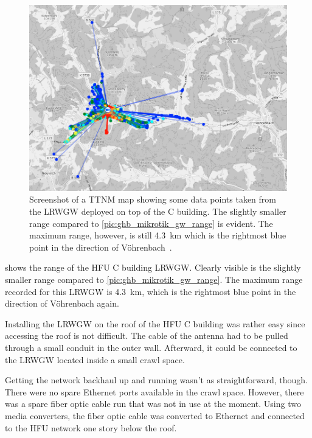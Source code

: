 \begin{figure}[htbp]
    \centering
    \includegraphics[width=1\textwidth]{pictures/ttn-mapper/gateway-ranges/c_building_gw_range.png}
    \caption{
        Screenshot of a \ac{TTNM} map showing some data points taken from the \acl{LRWGW} deployed on top of the C building.
        The slightly smaller range compared to \cref{pic:ghb_mikrotik_gw_range} is evident.
        The maximum range, however, is still \SI{4.3}{\kilo\meter} which is the rightmost blue point in the direction of Vöhrenbach~\cite{ttn_mapper_ttn_2023}.
    }\label{pic:c_building_gw_range}
\end{figure}

 shows the range of the \ac{HFU} C building \acl{LRWGW}.
Clearly visible is the slightly smaller range compared to \cref{pic:ghb_mikrotik_gw_range}.
The maximum range recorded for this \acl{LRWGW} is \SI{4.3}{\kilo\meter}, which is the rightmost blue point in the direction of Vöhrenbach again.

Installing the \acl{LRWGW} on the roof of the \ac{HFU} C building was rather easy since accessing the roof is not difficult.
The cable of the antenna had to be pulled through a small conduit in the outer wall.
Afterward, it could be connected to the \acl{LRWGW} located inside a small crawl space.

Getting the network backhaul up and running wasn't as straightforward, though.
There were no spare Ethernet ports available in the crawl space.
However, there was a spare fiber optic cable run that was not in use at the moment.
Using two media converters, the fiber optic cable was converted to Ethernet and connected to the \ac{HFU} network one story below the roof.

